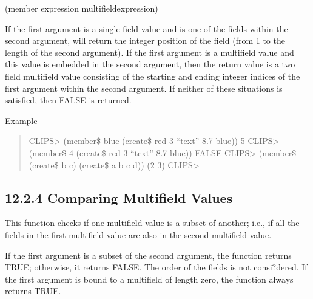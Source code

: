 \documentclass[letterpaper,10pt,english]{sphinxmanual}
\begin{document}

\begin{sphinxVerbatim}[commandchars=\\\{\}]
(member\PYGZdl{} \PYGZlt{}expression\PYGZgt{} \PYGZlt{}multifield\PYGZhy{}expression\PYGZgt{})
\end{sphinxVerbatim}

If the first argument is a single field value and is one of the fields
within the second argument,  will return the integer position
of the field (from 1 to the length of the second argument). If the first
argument is a multifield value and this value is embedded in the second
argument, then the return value is a two field multifield value
consisting of the starting and ending integer indices of the first
argument within the second argument. If neither of these situations is
satisfied, then FALSE is returned.

Example
\begin{quote}

CLIPS\textgreater{} (member\$ blue (create\$ red 3 “text” 8.7 blue))
5
CLIPS\textgreater{} (member\$ 4 (create\$ red 3 “text” 8.7 blue))
FALSE
CLIPS\textgreater{} (member\$ (create\$ b c) (create\$ a b c d))
(2 3)
CLIPS\textgreater{}
\end{quote}


\subsection{12.2.4 Comparing Multifield Values}
\label{\detokenize{actions:comparing-multifield-values}}
This function checks if one multifield value is a subset of another;
i.e., if all the fields in the first multifield value are also in the
second multifield value.


\begin{sphinxVerbatim}[commandchars=\\\{\}]
  
\end{sphinxVerbatim}

If the first argument is a subset of the second argument, the function
returns TRUE; otherwise, it returns FALSE. The order of the fields is
not consi?dered. If the first argument is bound to a multifield of
length zero, the  function always returns TRUE.
\end{document}
